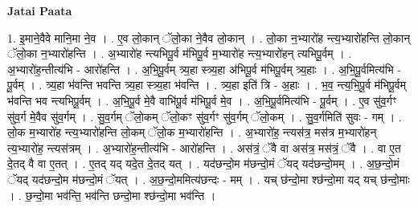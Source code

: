 \documentclass[17pt]{extarticle}
\begin{document}
\textbf{Jatai Paata} \newline

1. इ॒माने॒वैवे मानि॒मा ने॒व । . ए॒व लो॒कान् ॅलो॒का ने॒वैव लो॒कान् । . लो॒का न॒भ्यारो॑ह न्त्य॒भ्यारो॑हन्ति लो॒कान् ॅलो॒का न॒भ्यारो॑हन्ति । . अ॒भ्यारो॑ह न्त्यभिपू॒र्व म॑भिपू॒र्व म॒भ्यारो॑ह न्त्य॒भ्यारो॑हन् त्यभिपू॒र्वम् । . अ॒भ्यारो॑ह॒न्तीत्य॑भि - आरो॑हन्ति । . अ॒भि॒पू॒र्वम् त्र्य॒हा स्त्र्य॒हा अ॑भिपू॒र्व म॑भिपू॒र्वम् त्र्य॒हाः । . अ॒भि॒पू॒र्वमित्य॑भि - पू॒र्वम् । . त्र्य॒हा भ॑वन्ति भवन्ति त्र्य॒हा स्त्र्य॒हा भ॑वन्ति । . त्र्य॒हा इति॑ त्रि - अ॒हाः । . भ॒व॒ न्त्य॒भि॒पू॒र्व म॑भिपू॒र्वम् भ॑वन्ति भव न्त्यभिपू॒र्वम् । . अ॒भि॒पू॒र्व मे॒वै वाभि॑पू॒र्व म॑भिपू॒र्व मे॒व । . अ॒भि॒पू॒र्वमित्य॑भि - पू॒र्वम् । . ए॒व सु॑व॒र्गꣳ सु॑व॒र्ग मे॒वैव सु॑व॒र्गम् । . सु॒व॒र्गम् ॅलो॒कम् ॅलो॒कꣳ सु॑व॒र्गꣳ सु॑व॒र्गम् ॅलो॒कम् । . सु॒व॒र्गमिति॑ सुवः - गम् । . लो॒क म॒भ्यारो॑ह न्त्य॒भ्यारो॑हन्ति लो॒कम् ॅलो॒क म॒भ्यारो॑हन्ति । . अ॒भ्यारो॑ह॒ न्त्यस॑त्र॒ मस॑त्र म॒भ्यारो॑हन् त्य॒भ्यारो॑ह॒ न्त्यस॑त्रम् । . अ॒भ्यारो॑ह॒न्तीत्य॑भि - आरो॑हन्ति । . अस॑त्रं॒ ॅवै वा अस॑त्र॒ मस॑त्रं॒ ॅवै । . वा ए॒त दे॒तद् वै वा ए॒तत् । . ए॒तद् यद् यदे॒त दे॒तद् यत् । . यद॑छन्दो॒म म॑छन्दो॒मं ॅयद् यद॑छन्दो॒मम् । . अ॒छ॒न्दो॒मं ॅयद् यद॑छन्दो॒म म॑छन्दो॒मं ॅयत् । . अ॒छ॒न्दो॒ममित्य॑छन्दः - मम् । . यच् छ॑न्दो॒मा श्छ॑न्दो॒मा यद् यच् छ॑न्दो॒माः । . छ॒न्दो॒मा भव॑न्ति॒ भव॑न्ति छन्दो॒मा श्छ॑न्दो॒मा भव॑न्ति । \newline
\end{document}
